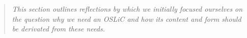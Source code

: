 %
%
%
%
%


\footnotesize \begin{quote}\itshape This section outlines reflections by which
we initially focused ourselves on the question why we need an OSLiC and how its
content and form should be derivated from these needs.
\end{quote}
\normalsize{}

%
%
%
%
%


